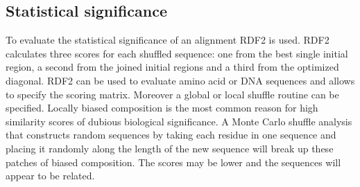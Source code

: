 	\subsection{Statistical significance}
	To evaluate the statistical significance of an alignment RDF2 is used.
	RDF2 calculates three scores for each shuffled sequence: one from the best single initial region, a second from the joined initial regions and a third from the optimized diagonal.
	RDF2 can be used to evaluate amino acid or DNA sequences and allows to specify the scoring matrix.
	Moreover a global or local shuffle routine can be specified.
	Locally biased composition is the most common reason for high similarity scores of dubious biological significance.
	A Monte Carlo shuffle analysis that constructs random sequences by taking each residue in one sequence and placing it randomly along the length of the new sequence will break up these patches of biased composition.
	The scores may be lower and the sequences will appear to be related.

